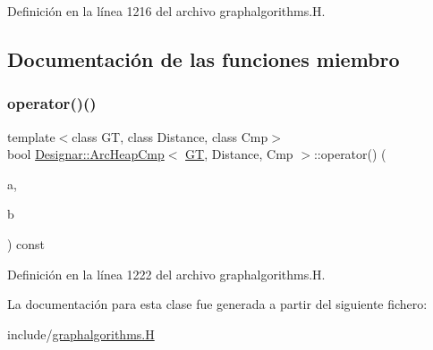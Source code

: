 Definición en la línea 1216 del archivo graphalgorithms.\+H.



\subsection{Documentación de las funciones miembro}
\mbox{\label{class_designar_1_1_arc_heap_cmp_a9d86fd876bad098a0a6844e9b302f141}} 
\subsubsection{\texorpdfstring{operator()()}{operator()()}}
{\footnotesize\ttfamily template$<$class GT, class Distance, class Cmp$>$ \\
bool \hyperlink{class_designar_1_1_arc_heap_cmp}{Designar\+::\+Arc\+Heap\+Cmp}$<$ \hyperlink{demo-buildgraph_8_c_a3001c40d2c31ca87ed96cd7d1334a55e}{GT}, Distance, Cmp $>$\+::operator() (\begin{DoxyParamCaption}\item[{typename G\+T\+::\+Arc $\ast$}]{a,  }\item[{typename G\+T\+::\+Arc $\ast$}]{b }\end{DoxyParamCaption}) const\hspace{0.3cm}{\ttfamily [inline]}}



Definición en la línea 1222 del archivo graphalgorithms.\+H.



La documentación para esta clase fue generada a partir del siguiente fichero\+:\begin{DoxyCompactItemize}
\item 
include/\hyperlink{graphalgorithms_8_h}{graphalgorithms.\+H}\end{DoxyCompactItemize}
